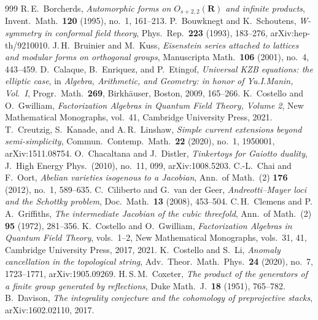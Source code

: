 \begin{thebibliography}{999}
 R.\,E.~Borcherds, \emph{Automorphic forms on $O_{s+2,2}(\mathbf{R})$ and infinite products}, Invent.\ Math.\ \textbf{120} (1995), no.~1, 161--213. %
 P.~Bouwknegt and K.~Schoutens, \emph{W-symmetry in conformal field theory}, Phys.\ Rep.\ \textbf{223} (1993), 183--276, arXiv:hep-th/9210010. %
 J.\,H.~Bruinier and M.~Kuss, \emph{Eisenstein series attached to lattices and modular forms on orthogonal groups}, Manuscripta Math.\ \textbf{106} (2001), no.~4, 443--459.
 D.~Calaque, B.~Enriquez, and P.~Etingof, \emph{Universal KZB equations: the elliptic case}, in \emph{Algebra, Arithmetic, and Geometry: in honor of Yu.\@ I.\@ Manin, Vol.~I}, Progr.\ Math.\ \textbf{269}, Birkh\"auser, Boston, 2009, 165--266. %
 K.~Costello and O.~Gwilliam, \emph{Factorization Algebras in Quantum Field Theory, Volume 2}, New Mathematical Monographs, vol.~41, Cambridge University Press, 2021. %
 T.~Creutzig, S.~Kanade, and A.\,R.~Linshaw, \emph{Simple current extensions beyond semi-simplicity}, Commun.\ Contemp.\ Math.\ \textbf{22} (2020), no.~1, 1950001, arXiv:1511.08754.
 O.~Chacaltana and J.~Distler, \emph{Tinkertoys for Gaiotto duality}, J.~High Energy Phys.\ (2010), no.~11, 099, arXiv:1008.5203.
 C.-L.~Chai and F.~Oort, \emph{Abelian varieties isogenous to a Jacobian}, Ann.\ of Math.\ (2) \textbf{176} (2012), no.~1, 589--635.
 C.~Ciliberto and G.~van der Geer, \emph{Andreotti--Mayer loci and the Schottky problem}, Doc.\ Math.\ \textbf{13} (2008), 453--504.
 C.\,H.~Clemens and P.\,A.~Griffiths, \emph{The intermediate Jacobian of the cubic threefold}, Ann.\ of Math.\ (2) \textbf{95} (1972), 281--356.
 K.~Costello and O.~Gwilliam, \emph{Factorization Algebras in Quantum Field Theory}, vols.~1--2, New Mathematical Monographs, vols.~31, 41, Cambridge University Press, 2017, 2021. %
 K.~Costello and S.~Li, \emph{Anomaly cancellation in the topological string}, Adv.\ Theor.\ Math.\ Phys.\ \textbf{24} (2020), no.~7, 1723--1771, arXiv:1905.09269. %
 H.\,S.\,M.~Coxeter, \emph{The product of the generators of a finite group generated by reflections}, Duke Math.\ J.\ \textbf{18} (1951), 765--782.
 B.~Davison, \emph{The integrality conjecture and the cohomology of preprojective stacks}, arXiv:1602.02110, 2017. %

\end{thebibliography}
